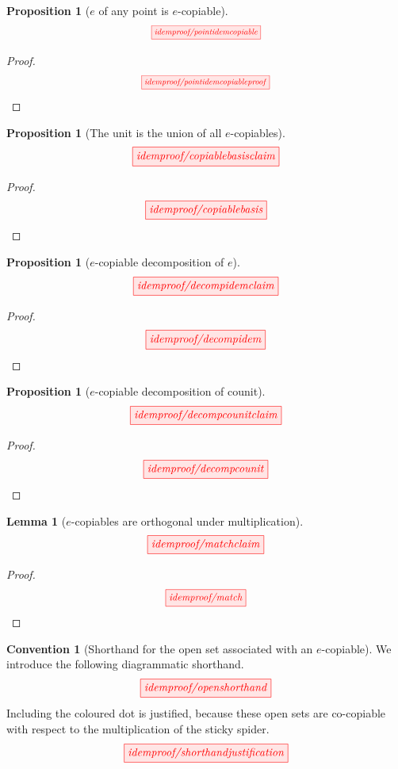 \documentclass{tufte-handout}
\theoremstyle{definition}
\newtheorem{lemma}[theorem]{Lemma}
\newtheorem{proposition}[theorem]{Proposition}
\newtheorem{convention}[theorem]{Convention}
\begin{document}
\begin{fullwidth}
\begin{proposition}[$e$ of any point is $e$-copiable]\label{prop:epointcopy}
\[\scalebox{0.75}{\tikzfig{idemproof/pointidemcopiable}}\]
\begin{proof}
\[\scalebox{0.75}{\tikzfig{idemproof/pointidemcopiableproof}}\]
\end{proof}
\end{proposition}

\begin{proposition}[The unit is the union of all $e$-copiables]\label{prop:copiablebasis}
\[\scalebox{1}{\tikzfig{idemproof/copiablebasisclaim}}\]
\begin{proof}
\[\scalebox{1}{\tikzfig{idemproof/copiablebasis}}\]
\end{proof}
\end{proposition}

\begin{proposition}[$e$-copiable decomposition of $e$]\label{prop:decompidem}
\[\scalebox{1}{\tikzfig{idemproof/decompidemclaim}}\]
\begin{proof}
\[\scalebox{1}{\tikzfig{idemproof/decompidem}}\]
\end{proof}
\end{proposition}

\begin{proposition}[$e$-copiable decomposition of counit]\label{prop:decompcounit}
\[\scalebox{1}{\tikzfig{idemproof/decompcounitclaim}}\]
\begin{proof}
\[\scalebox{1}{\tikzfig{idemproof/decompcounit}}\]
\end{proof}
\end{proposition}


\begin{lemma}[$e$-copiables are orthogonal under multiplication]\label{lem:match}
\[\scalebox{1}{\tikzfig{idemproof/matchclaim}}\]
\begin{proof}
\[\scalebox{0.9}{\tikzfig{idemproof/match}}\]
\end{proof}
\end{lemma}

\begin{convention}[Shorthand for the open set associated with an $e$-copiable]
We introduce the following diagrammatic shorthand.
\[\scalebox{1}{\tikzfig{idemproof/openshorthand}}\]
Including the coloured dot is justified, because these open sets are co-copiable with respect to the multiplication of the sticky spider.
\[\scalebox{1}{\tikzfig{idemproof/shorthandjustification}}\]
\end{convention}


\end{fullwidth}
\end{document}
